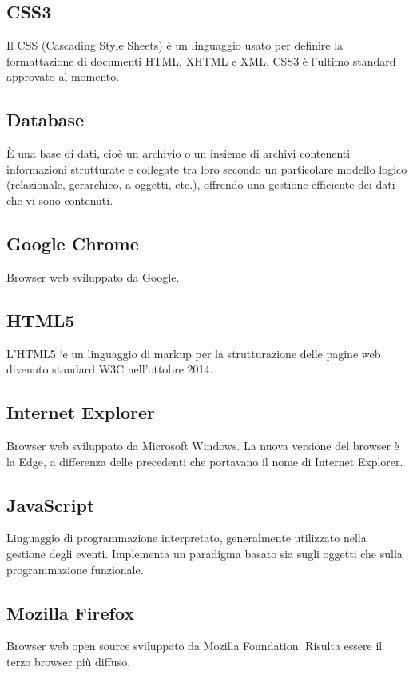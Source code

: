 \documentclass[a4paper, titlepage]{article}
\begin{document}
	 \subsection{CSS3}
	 Il CSS (Cascading Style Sheets) è un linguaggio usato per definire la formattazione di documenti HTML, XHTML e XML. CSS3 è l’ultimo standard approvato al momento.

	 \subsection{Database}
	 È una base di dati, cioè un archivio o un insieme di archivi contenenti informazioni strutturate e
	 collegate tra loro secondo un particolare modello logico (relazionale, gerarchico, a oggetti, etc.),
	 offrendo una gestione efficiente dei dati che vi sono contenuti.

	 \subsection{Google Chrome}
	 Browser web sviluppato da Google.
	 
	 \subsection{HTML5}
	 L’HTML5 `e un linguaggio di markup per la strutturazione delle pagine web divenuto standard W3C nell’ottobre 2014.

	 \subsection{Internet Explorer}
	 Browser web sviluppato da Microsoft Windows. La nuova versione del browser è la Edge, a differenza delle precedenti che portavano il nome di Internet Explorer.

	 \subsection{JavaScript}
	 Linguaggio di programmazione interpretato, generalmente utilizzato nella gestione degli eventi.
	 Implementa un paradigma basato sia sugli oggetti che sulla programmazione funzionale.
	 
	 \subsection{Mozilla Firefox}
	 Browser web open source sviluppato da Mozilla Foundation. Risulta essere il terzo browser più diffuso.
	
\end{document}
